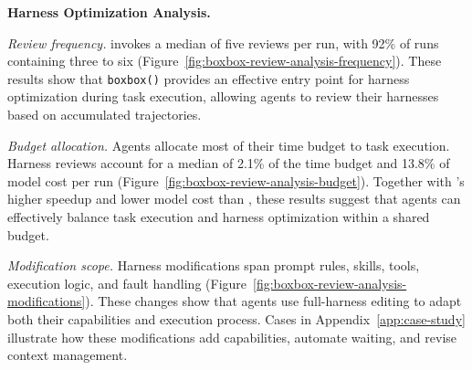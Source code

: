 
\textbf{Harness Optimization Analysis.}

\textit{Review frequency.}
\boxbox{} invokes a median of five reviews per run, with 92\% of runs containing three to six (Figure~\ref{fig:boxbox-review-analysis-frequency}). These results show that \texttt{boxbox()} provides an effective entry point for harness optimization during task execution, allowing agents to review their harnesses based on accumulated trajectories.

\textit{Budget allocation.}
Agents allocate most of their time budget to task execution. Harness reviews account for a median of 2.1\% of the time budget and 13.8\% of model cost per run (Figure~\ref{fig:boxbox-review-analysis-budget}). Together with \boxbox{}'s higher speedup and lower model cost than \frozen{}, these results suggest that agents can effectively balance task execution and harness optimization within a shared budget.

\textit{Modification scope.}
Harness modifications span prompt rules, skills, tools, execution logic, and fault handling (Figure~\ref{fig:boxbox-review-analysis-modifications}). These changes show that agents use full-harness editing to adapt both their capabilities and execution process. Cases in Appendix~\ref{app:case-study} illustrate how these modifications add capabilities, automate waiting, and revise context management.

